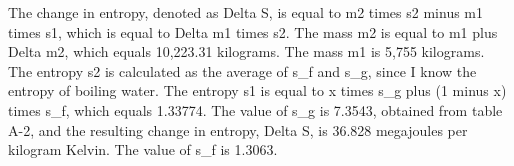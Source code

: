The change in entropy, denoted as Delta S, is equal to m2 times s2 minus m1 times s1, which is equal to Delta m1 times s2. The mass m2 is equal to m1 plus Delta m2, which equals 10,223.31 kilograms. The mass m1 is 5,755 kilograms. The entropy s2 is calculated as the average of s_f and s_g, since I know the entropy of boiling water. The entropy s1 is equal to x times s_g plus (1 minus x) times s_f, which equals 1.33774. The value of s_g is 7.3543, obtained from table A-2, and the resulting change in entropy, Delta S, is 36.828 megajoules per kilogram Kelvin. The value of s_f is 1.3063.